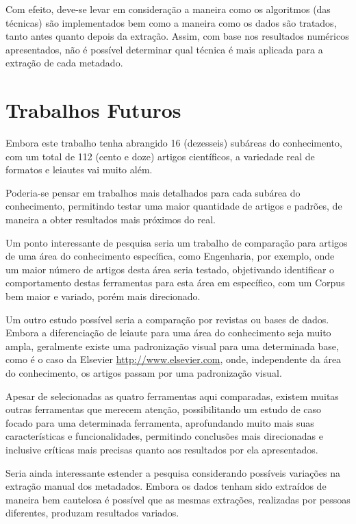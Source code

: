 Com efeito, deve-se levar em consideração a maneira como os algoritmos (das técnicas) são implementados bem como a maneira como os dados são tratados, tanto antes quanto depois da extração. Assim, com base nos resultados numéricos apresentados, não é possível determinar qual técnica é mais aplicada para a extração de cada metadado.

\section{Trabalhos Futuros}
\label{sec:future-work}

Embora este trabalho tenha abrangido 16 (dezesseis) subáreas do conhecimento, com um total de 112 (cento e doze) artigos científicos, a variedade real de formatos e leiautes vai muito além.

Poderia-se pensar em trabalhos mais detalhados para cada subárea do conhecimento, permitindo testar uma maior quantidade de artigos e padrões, de maneira a obter resultados mais próximos do real.

Um ponto interessante de pesquisa seria um trabalho de comparação para artigos de uma área do conhecimento específica, como Engenharia, por exemplo, onde um maior número de artigos desta área seria testado, objetivando identificar o comportamento destas ferramentas para esta área em específico, com um Corpus bem maior e variado, porém mais direcionado.

Um outro estudo possível seria a comparação por revistas ou bases de dados. Embora a diferenciação de leiaute para uma área do conhecimento seja muito ampla, geralmente existe uma padronização visual para uma determinada base, como é o caso da Elsevier \url{http://www.elsevier.com}, onde, independente da área do conhecimento, os artigos passam por uma padronização visual. 

Apesar de selecionadas as quatro ferramentas aqui comparadas, existem muitas outras ferramentas que merecem atenção, possibilitando um estudo de caso focado para uma determinada ferramenta, aprofundando muito mais suas características e funcionalidades, permitindo conclusões mais direcionadas e inclusive críticas mais precisas quanto aos resultados por ela apresentados.

Seria ainda interessante estender a pesquisa considerando possíveis variações na extração manual dos metadados. Embora os dados tenham sido extraídos de maneira bem cautelosa é possível que as mesmas extrações, realizadas por pessoas diferentes, produzam resultados variados.

